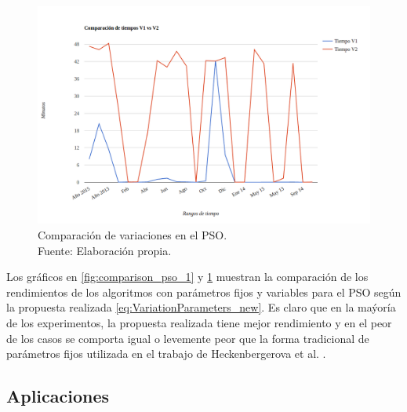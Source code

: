 \begin{figure}[ht!]
    \begin{center}
        \includegraphics[width=\textwidth]{figures/comp_v1_v2_tiempo.png}
    \end{center}    
    \caption{Comparación de variaciones en el PSO.\\ Fuente: Elaboración propia.}
    \label{fig:comparison_pso_2}
\end{figure}
Los gráficos en \ref{fig:comparison_pso_1} y  \ref{fig:comparison_pso_2} muestran la comparación de los rendimientos de los algoritmos con parámetros fijos y variables para el PSO según la propuesta realizada \ref{eq:VariationParameters_new}. Es claro que en la maýoría de los experimentos, la propuesta realizada tiene mejor rendimiento y en el peor de los casos se comporta igual o levemente peor que la forma tradicional de parámetros fijos utilizada en el trabajo de Heckenbergerova et al. \cite{Heckenbergerova15}.

\pagebreak
\subsection{Aplicaciones}


\pagebreak

